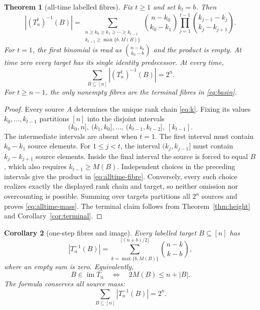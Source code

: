 \documentclass[a4paper,11pt]{amsart}
\newtheorem{theorem}{Theorem}[section]
\newtheorem{corollary}[theorem]{Corollary}
\theoremstyle{remark}
\newcommand{\im}{\operatorname{im}}
\begin{document}
\begin{theorem}[all-time labelled fibres]\label{thm:alltime-fibre}
Fix $t\geq1$ and set $k_t=b$.  Then
\begin{equation}\label{eq:alltime-fibre}
 |(T_n^t)^{-1}(B)|=
 \sum_{\substack{n\geq k_0\geq k_1\geq\cdots\geq k_{t-1}\\
                         k_{t-1}\geq\max\{b,M(B)\}}}
 \binom{n-k_0}{k_0-k_1}
 \prod_{j=1}^{t-1}
 \binom{k_{j-1}-k_j}{k_j-k_{j+1}}.
\end{equation}
For $t=1$, the first binomial is read as
$\binom{n-k_0}{k_0-b}$ and the product is empty.  At time zero every target
has its single identity predecessor.  At every time,
\begin{equation}\label{eq:alltime-mass}
 \sum_{B\subseteq[n]}|(T_n^t)^{-1}(B)|=2^n.
\end{equation}
For $t\geq n-1$, the only nonempty fibres are the terminal fibres in
\eqref{eq:basin}.
\end{theorem}

\begin{proof}
Every source $A$ determines the unique rank chain \eqref{eq:k}.  Fixing its
values $k_0,\ldots,k_{t-1}$ partitions $[n]$ into the disjoint intervals
\[
 (k_0,n],\ (k_1,k_0],\ldots,\ (k_{t-1},k_{t-2}],\ [k_{t-1}].
\]
The intermediate intervals are absent when $t=1$.
The first interval must contain $k_0-k_1$ source elements.  For
$1\leq j<t$, the interval $(k_j,k_{j-1}]$ must contain
$k_j-k_{j+1}$ source elements.  Inside the final interval the source is
forced to equal $B$, which also requires $k_{t-1}\geq M(B)$.  Independent
choices in the preceding intervals give the product in
\eqref{eq:alltime-fibre}.  Conversely, every such choice realizes exactly
the displayed rank chain and target, so neither omission nor overcounting is
possible.  Summing over targets partitions all $2^n$ sources and proves
\eqref{eq:alltime-mass}.  The terminal claim follows from
Theorem~\ref{thm:height} and Corollary~\ref{cor:terminal}.
\end{proof}

\begin{corollary}[one-step fibres and image]\label{thm:fibre}
Every labelled target $B\subseteq[n]$ has
\begin{equation}\label{eq:fibre}
 |T_n^{-1}(B)|=
 \sum_{k=\max\{b,M(B)\}}^{\lfloor(n+b)/2\rfloor}
 \binom{n-k}{k-b},
\end{equation}
where an empty sum is zero.  Equivalently,
\begin{equation}\label{eq:imagecriterion}
 B\in\im T_n\quad\Longleftrightarrow\quad
 2M(B)\leq n+|B|.
\end{equation}
The formula conserves all source mass:
\begin{equation}\label{eq:mass}
 \sum_{B\subseteq[n]}|T_n^{-1}(B)|=2^n.
\end{equation}
\end{corollary}
\end{document}
